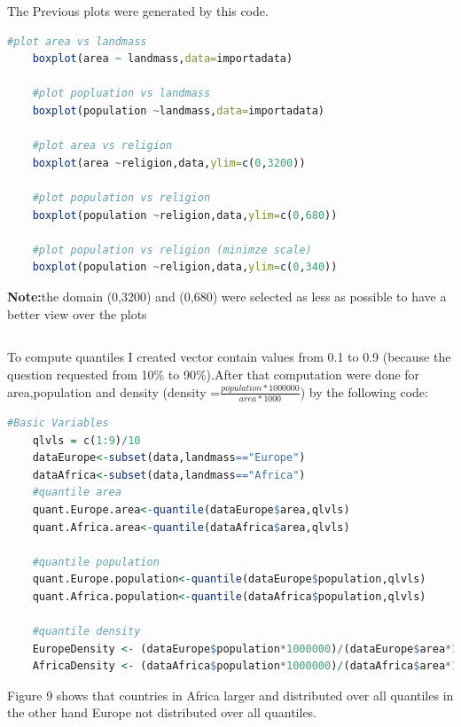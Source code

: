 \documentclass{article}
\begin{document}
	The Previous plots were generated by this code.
	\begin{lstlisting}[language=R]
	#plot area vs landmass
	boxplot(area ~ landmass,data=importadata)
	
	#plot popluation vs landmass
	boxplot(population ~landmass,data=importadata)
	
	#plot area vs religion
	boxplot(area ~religion,data,ylim=c(0,3200))
	
	#plot population vs religion
	boxplot(population ~religion,data,ylim=c(0,680))
	
	#plot population vs religion (minimze scale)
	boxplot(population ~religion,data,ylim=c(0,340))
	\end{lstlisting}
	\textbf{Note:}the domain (0,3200) and (0,680) were selected as less as possible to have a better view over the plots
	\subsection*{}
	To compute quantiles I created vector contain values from 0.1 to 0.9 (because the question requested from 10\% to 90\%).After that computation were done for area,population and density (density =\(\frac{population*1000000}{area*1000}\)) by the following code:
	\begin{lstlisting}[language=R]
	#Basic Variables
	qlvls = c(1:9)/10
	dataEurope<-subset(data,landmass=="Europe")
	dataAfrica<-subset(data,landmass=="Africa")
	#quantile area 
	quant.Europe.area<-quantile(dataEurope$area,qlvls)
	quant.Africa.area<-quantile(dataAfrica$area,qlvls)
	
	#quantile population
	quant.Europe.population<-quantile(dataEurope$population,qlvls)
	quant.Africa.population<-quantile(dataAfrica$population,qlvls)
	
	#quantile density
	EuropeDensity <- (dataEurope$population*1000000)/(dataEurope$area*1000)
	AfricaDensity <- (dataAfrica$population*1000000)/(dataAfrica$area*1000)
	\end{lstlisting}
	Figure 9 shows that countries in Africa larger and distributed over all quantiles in the other hand Europe not distributed over all quantiles.
\end{document}
